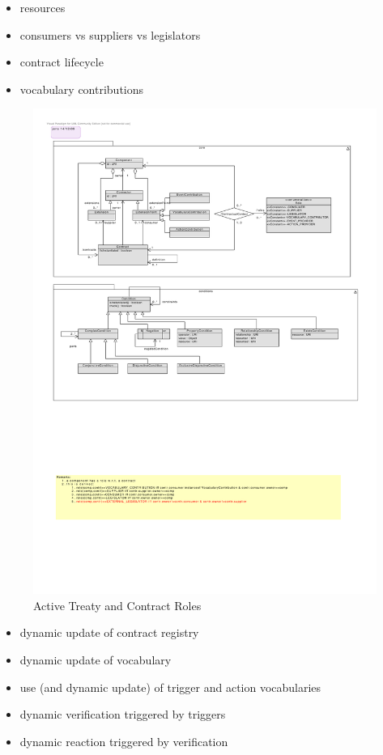\documentclass{llncs}
\begin{document}
\begin{itemize}
\item resources
\item consumers vs suppliers vs legislators
\item contract lifecycle
\item vocabulary contributions
\end{itemize}



\begin{figure}[t]
\centering
\includegraphics[width=1.0\textwidth]{RoleModel2.pdf}
\caption{Active Treaty and Contract Roles}
\label{fig1}
\end{figure}

\begin{itemize}
  \item dynamic update of contract registry
  \item dynamic update of vocabulary
  \item use (and dynamic update) of trigger and action vocabularies
  \item dynamic verification triggered by triggers
  \item dynamic reaction triggered by verification
\end{itemize}
\end{document}
